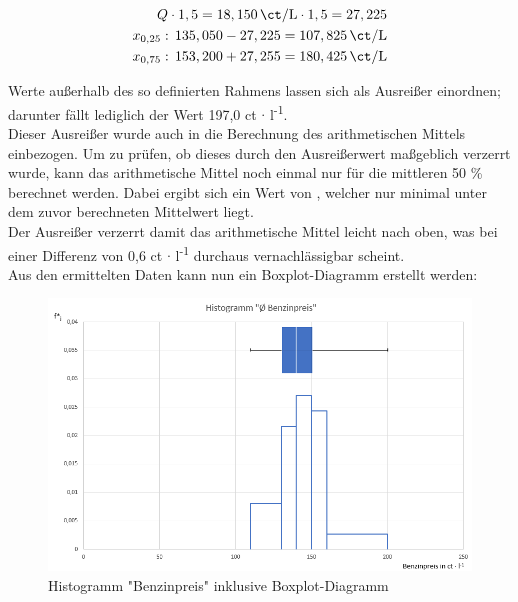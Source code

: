\begin{align}
 Q \cdot 1,5 = 18,150 \, \si{\ct\per\liter} \cdot 1,5 = 27,225\\
 x_{0,25}: \, 135,050 - 27,225 = 107,825 \, \si{\ct\per\liter}\\
 x_{0,75}: \, 153,200 + 27,255 = 180,425 \, \si{\ct\per\liter}
\end{align}

Werte außerhalb des so definierten Rahmens lassen sich als Ausreißer einordnen; darunter fällt lediglich der Wert 197,0 ct $\cdot$ l\textsuperscript{-1}.\\
Dieser Ausreißer wurde auch in die Berechnung des arithmetischen Mittels einbezogen. Um zu prüfen, ob dieses durch den Ausreißerwert maßgeblich verzerrt wurde, kann das arithmetische Mittel noch einmal nur für die mittleren 50 \% berechnet werden. Dabei ergibt sich ein Wert von , welcher nur minimal unter dem zuvor berechneten Mittelwert liegt.\\
Der Ausreißer verzerrt damit das arithmetische Mittel leicht nach oben, was bei einer Differenz von 0,6 ct $\cdot$ l\textsuperscript{-1} durchaus vernachlässigbar scheint.\\

Aus den ermittelten Daten kann nun ein Boxplot-Diagramm erstellt werden:

\begin{figure}[H]
  \centering
  \includegraphics[width = \textwidth]{graphics/histogram_mit_boxplot.png}
  \caption{Histogramm "Benzinpreis" inklusive Boxplot-Diagramm}
  \label{fig:histBoxBenzUni}
\end{figure}

